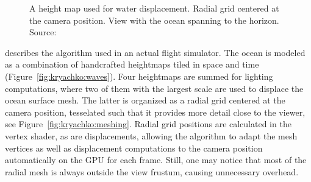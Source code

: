 \begin{figure}
{	\label{fig:kryachko:meshing}
 }
 \hfill
 \caption[Adaptive level-of-detail for the ocean surface by \cite{Kryachko:2005}.]{
   A height map used for water displacement.
   Radial grid centered at the camera position.
   View with the ocean spanning to the horizon.
  Source:~\cite{Kryachko:2005}
}
\label{fig:kryachko}
\end{figure}
%

\citet{Kryachko:2005} describes the algorithm used in an actual flight simulator.
The ocean is modeled as a combination of handcrafted heightmaps tiled in space
and time (Figure~\ref{fig:kryachko:waves}). Four heightmaps are summed for lighting computations, where two of them
with the largest scale are used to displace the ocean surface mesh. The latter is
organized as a radial grid centered at the camera position, tesselated such that
it provides more detail close to the viewer, see Figure~\ref{fig:kryachko:meshing}.
Radial grid positions are calculated in the vertex shader, as are displacements,
allowing the algorithm to adapt the mesh vertices as well as displacement computations
to the camera position automatically on the GPU for each frame. Still, one may
notice that most of the radial mesh is always outside the view frustum,
causing unnecessary overhead.

